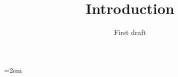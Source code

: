 \documentclass[a4paper,english]{report}
\begin{document}
\title{Introduction}
\subtitle{First draft}

\maketitle








\newpage
\emergencystretch=2em
\printbibliography
\end{document}
